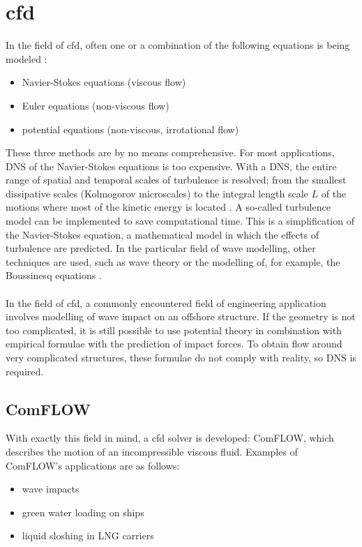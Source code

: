 \section{\acrfull{cfd}}
In the field of \acrfull{cfd}, often one or a combination of the following equations is being modeled \parencite{vanderPlas2017}:
\begin{itemize}
    \item Navier-Stokes equations (viscous flow)
    \item Euler equations (non-viscous flow) 
    \item potential equations (non-viscous, irrotational flow)
\end{itemize}
These three methods are by no means comprehensive. For most applications, \acrfull{DNS} of the Navier-Stokes equations is too expensive. With a \acrshort{DNS}, the entire range of spatial and temporal scales of turbulence is resolved; from the smallest dissipative scales (Kolmogorov microscales) to the integral length scale $L$ of the motions where most of the kinetic energy is located \parencite{Westerweel_Turbulence2016}. A so-called turbulence model can be implemented to save computational time. This is a simplification of the Navier-Stokes equation, a mathematical model in which the effects of turbulence are predicted. 
In the particular field of wave modelling, other techniques are used, such as wave theory or the modelling of, for example, the Boussinesq equations \parencite{vanderPlas2017}.\\
\\
In the field of \acrshort{cfd}, a commonly encountered field of engineering application involves modelling of wave impact on an offshore structure. If the geometry is not too complicated, it is still possible to use potential theory in combination with empirical formulae with the prediction of impact forces. To obtain flow around very complicated structures, these formulae do not comply with reality, so \acrshort{DNS} is required.

\subsection{ComFLOW}
\label{subsec: comflow literature review}
With exactly this field in mind, a \acrshort{cfd} solver is developed: ComFLOW, which describes the motion of an incompressible viscous fluid. Examples of ComFLOW's applications are as follows:
\begin{itemize}
    \item wave impacts
    \item green water loading on ships
    \item liquid sloshing in LNG carriers
\end{itemize}

